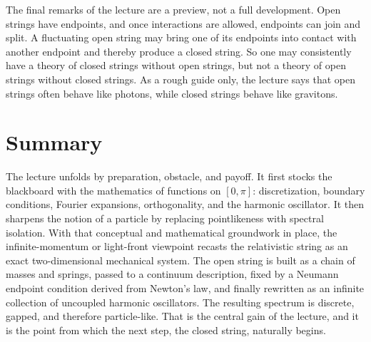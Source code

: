 The final remarks of the lecture are a preview, not a full development. Open strings have endpoints, and once interactions are allowed, endpoints can join and split. A fluctuating open string may bring one of its endpoints into contact with another endpoint and thereby produce a closed string. So one may consistently have a theory of closed strings without open strings, but not a theory of open strings without closed strings. As a rough guide only, the lecture says that open strings often behave like photons, while closed strings behave like gravitons.

\section{Summary}

The lecture unfolds by preparation, obstacle, and payoff. It first stocks the blackboard with the mathematics of functions on \([0,\pi]\): discretization, boundary conditions, Fourier expansions, orthogonality, and the harmonic oscillator. It then sharpens the notion of a particle by replacing pointlikeness with spectral isolation. With that conceptual and mathematical groundwork in place, the infinite-momentum or light-front viewpoint recasts the relativistic string as an exact two-dimensional mechanical system. The open string is built as a chain of masses and springs, passed to a continuum description, fixed by a Neumann endpoint condition derived from Newton's law, and finally rewritten as an infinite collection of uncoupled harmonic oscillators. The resulting spectrum is discrete, gapped, and therefore particle-like. That is the central gain of the lecture, and it is the point from which the next step, the closed string, naturally begins.